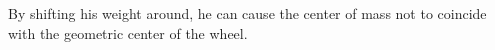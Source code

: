 By shifting his weight around, he can cause the center of mass not to coincide
with the geometric center of the wheel.



